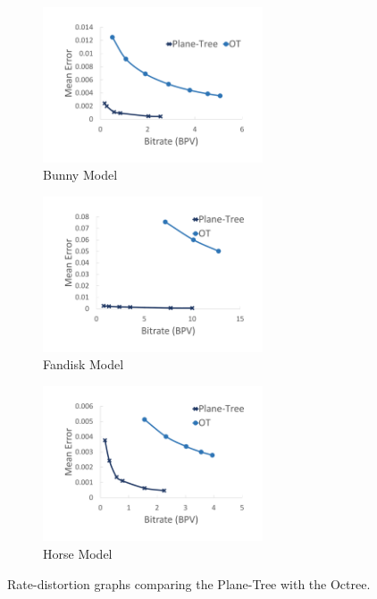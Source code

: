 \begin{figure}[!htb] 
        \centering
        \begin{subfigure}[b]{6.8cm}
                \includegraphics[width=6.5cm]{images/results/compression/OTbunny}
                \caption{Bunny Model}
                \label{fig:OG_BUNNY}
        \end{subfigure}%
        \begin{subfigure}[b]{6.8cm}
                \includegraphics[width=6.5cm]{images/results/compression/OTFandisk}
                \caption{Fandisk Model}
                \label{fig:OG_FANDISK}
        \end{subfigure}
        
        \begin{subfigure}[b]{6.8cm}
                \includegraphics[width=6.5cm]{images/results/compression/OTHorse}
                \caption{Horse Model}
                \label{fig:OG_HORSE}
        \end{subfigure}%

       \caption{Rate-distortion graphs comparing the Plane-Tree with the Octree.}
       \label{fig:OTEXPS}
\end{figure}